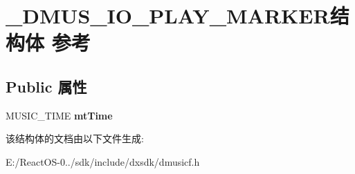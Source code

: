 \hypertarget{struct___d_m_u_s___i_o___p_l_a_y___m_a_r_k_e_r}{}\section{\+\_\+\+D\+M\+U\+S\+\_\+\+I\+O\+\_\+\+P\+L\+A\+Y\+\_\+\+M\+A\+R\+K\+E\+R结构体 参考}
\label{struct___d_m_u_s___i_o___p_l_a_y___m_a_r_k_e_r}
\subsection*{Public 属性}
\begin{DoxyCompactItemize}
\item 
\mbox{\label{struct___d_m_u_s___i_o___p_l_a_y___m_a_r_k_e_r_a439650b8ba6ab797d0f67d229feb815c}} 
M\+U\+S\+I\+C\+\_\+\+T\+I\+ME {\bfseries mt\+Time}
\end{DoxyCompactItemize}


该结构体的文档由以下文件生成\+:\begin{DoxyCompactItemize}
\item 
E\+:/\+React\+O\+S-\/0../sdk/include/dxsdk/dmusicf.\+h\end{DoxyCompactItemize}
